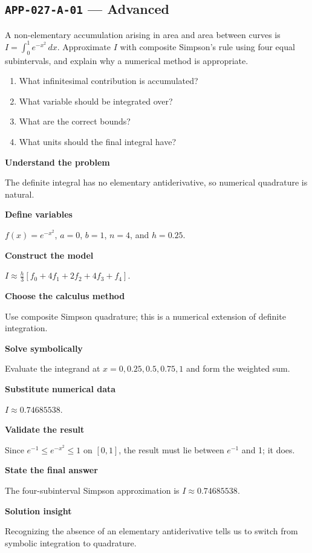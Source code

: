\documentclass[11pt]{book}
\newcommand{\pid}[1]{\texttt{#1}}
\begin{document}
\subsection*{\pid{APP-027-A-01} — Advanced}
\begin{problembox}
A non-elementary accumulation arising in area and area between curves is $I=\int_0^1 e^{-x^2}\,dx$. Approximate $I$ with composite Simpson's rule using four equal subintervals, and explain why a numerical method is appropriate.
\end{problembox}
\begin{promptbox}\begin{enumerate}
\item What infinitesimal contribution is accumulated?
\item What variable should be integrated over?
\item What are the correct bounds?
\item What units should the final integral have?
\end{enumerate}\end{promptbox}
\begin{solutionbox}
\textbf{Understand the problem}\par The definite integral has no elementary antiderivative, so numerical quadrature is natural.\par\medskip
\textbf{Define variables}\par $f(x)=e^{-x^2}$, $a=0$, $b=1$, $n=4$, and $h=0.25$.\par\medskip
\textbf{Construct the model}\par $I\approx\frac{h}{3}[f_0+4f_1+2f_2+4f_3+f_4]$.\par\medskip
\textbf{Choose the calculus method}\par Use composite Simpson quadrature; this is a numerical extension of definite integration.\par\medskip
\textbf{Solve symbolically}\par Evaluate the integrand at $x=0,0.25,0.5,0.75,1$ and form the weighted sum.\par\medskip
\textbf{Substitute numerical data}\par $I\approx 0.74685538$.\par\medskip
\textbf{Validate the result}\par Since $e^{-1}\le e^{-x^2}\le1$ on $[0,1]$, the result must lie between $e^{-1}$ and 1; it does.\par\medskip
\textbf{State the final answer}\par The four-subinterval Simpson approximation is $I\approx 0.74685538$.\par\medskip
\textbf{Solution insight}\par Recognizing the absence of an elementary antiderivative tells us to switch from symbolic integration to quadrature.\par\medskip
\end{solutionbox}
\end{document}
